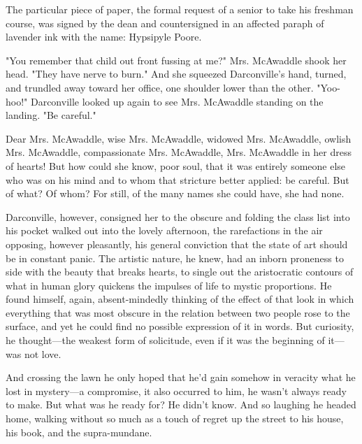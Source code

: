   The particular piece of paper, the formal request of a senior to take his
freshman course, was signed by the dean and countersigned in an affected paraph
of lavender ink with the name: Hypsipyle Poore.

  "You remember that child out front fussing at me?" Mrs. McAwaddle shook her
head. "They have nerve to burn." And she squeezed Darconville's hand, turned,
and trundled 
away toward her office, one shoulder lower than the other.
"Yoo-hoo!" Darconville looked up again to see Mrs. McAwaddle standing on the
landing. "Be careful."

  Dear Mrs. McAwaddle, wise Mrs. McAwaddle, widowed Mrs. McAwaddle, owlish Mrs.
McAwaddle, compassionate Mrs. McAwaddle, Mrs. McAwaddle in her dress of hearts!
But how could she know, poor soul, that it was entirely someone else who was on
his mind and to whom that stricture better applied: be careful. But of what? Of
whom? For still, of the many names she could have, she had none.

  Darconville, however, consigned 
her to the obscure and folding the class list
into his pocket walked out into the lovely afternoon, the rarefactions 
in the air opposing, however pleasantly, his general conviction that the state 
of art should be in constant panic. The artistic nature, he knew, had an inborn
proneness to side with the beauty that breaks hearts, to single out the
aristocratic contours of what in human glory quickens the impulses of life to
mystic proportions. He found himself, again, absent-mindedly thinking of the
effect of that look in which everything that was most obscure in the relation
between two people rose to the surface, and yet he could find no possible
expression of it in words. But curiosity, he thought---the weakest form of
solicitude, even if it was the beginning of it---was not love.

  And crossing the lawn he only hoped that he'd gain somehow in veracity 
what he
lost in mystery---a compromise, it also occurred to him, he wasn't always ready to
make. But what was he ready for? He didn't know. And so laughing he headed home,
walking without so much as a touch of regret up the street to his house, his
book, and the supra-mundane.
